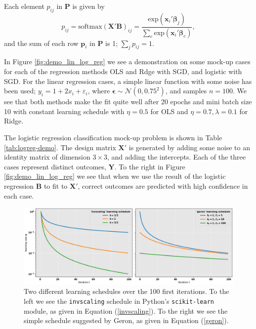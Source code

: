 \documentclass[]{article}
\begin{document}
Each element $p_{ij}$ in $\mathbf{P}$ is given by
\begin{equation} \label{log-reg-pij}
	p_{ij} = \mathrm{softmax}(\mathbf{X}'\mathbf{B})_{ij} = \frac{\mathrm{exp}(\mathbf{x}_i'\mathbf{\beta}_j)} {\sum_{c}\mathrm{exp}(\mathbf{x}_i'\mathbf{\beta}_c)},
\end{equation}
and the sum of each row $\mathbf{p}_i$ in $\mathbf{P}$ is 1; $\sum_{j} p_{ij} = 1$.

\vspace{5mm}

In Figure \ref{fig:demo_lin_log_reg} we see a demonstration on some mock-up cases for each of the regression methods OLS and Rdge with SGD, and logistic with SGD. For the linear regression cases, a simple linear function with some noise has been used; $y_i = 1 + 2x_i + \varepsilon_i$, where $\mathbf{\epsilon} \sim \mathcal{N}(0, 0.75^2)$, and samples $n=100$. We see that both methods make the fit quite well after 20 epochs and mini batch size 10 with constant learning schedule with $\eta = 0.5$ for OLS and $\eta = 0.7, \lambda=0.1$ for Ridge.

The logistic regression classification mock-up problem is shown in Table \ref{tab:logreg-demo}. The design matrix $\mathbf{X}'$ is generated by adding some noise to an identity matrix of dimension $3 \times 3$, and adding the intercepts. Each of the three cases represent distinct outcomes, $\mathbf{Y}$. To the right in Figure \ref{fig:demo_lin_log_reg} we see that when we use the result of the logistic regression $\mathbf{B}$ to fit to $\mathbf{X}'$, correct outcomes are predicted with high confidence in each case.

\begin{figure}[!htb]
	\centering
	\includegraphics[width=1\linewidth]{learning_schedules.png}
	\caption{Two different learning schedules over the 100 first iterations. To the left we see the \lstinline|invscaling| schedule in Python's \lstinline|scikit-learn| module, as given in Equation (\ref{invscaling}). To the right we see the simple schedule suggested by Geron, as given in Equation (\ref{geron}).}
	\label{fig:learning_schedules}
\end{figure}
\end{document}
